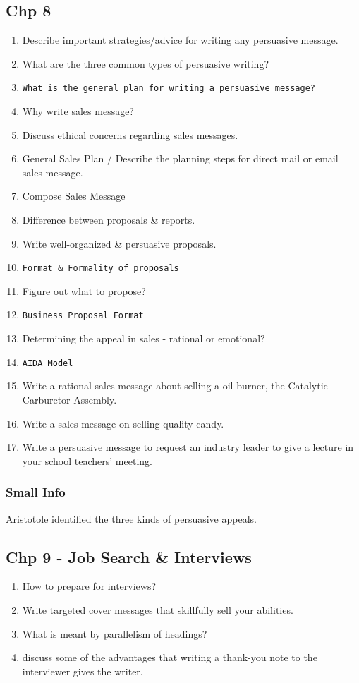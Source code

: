 \documentclass[11pt]{article}
\begin{document}
\subsection{Chp 8}
\label{sec:orgec95043}
\begin{enumerate}
\item Describe important strategies/advice for writing any persuasive message.
\item What are the three common types of persuasive writing?
\item \texttt{What is the general plan for writing a persuasive message?}
\item Why write sales message?
\item Discuss ethical concerns regarding sales messages.
\item General Sales Plan / Describe the planning steps for direct mail or email sales message.
\item Compose Sales Message
\item Difference between proposals \& reports.
\item Write well-organized \& persuasive proposals.
\item \texttt{Format \& Formality of proposals}
\item Figure out what to propose?
\item \texttt{Business Proposal Format}
\item Determining the appeal in sales - rational or emotional?
\item \texttt{AIDA Model}
\item Write a rational sales message about selling a oil burner, the Catalytic Carburetor Assembly.
\item Write a sales message on selling quality candy.
\item Write a persuasive message to request an industry leader to give a lecture in your school teachers' meeting.
\end{enumerate}
\subsubsection{Small Info}
\label{sec:orga3c4809}
Aristotole identified the three kinds of persuasive appeals.
\subsection{Chp 9 - Job Search \& Interviews}
\label{sec:org41e96f2}
\begin{enumerate}
\item How to prepare for interviews?
\item Write targeted cover messages that skillfully sell your abilities.
\item What is meant by parallelism of headings?
\item discuss some of the advantages that writing a thank-you note to the interviewer gives the writer.
\end{enumerate}
\end{document}
